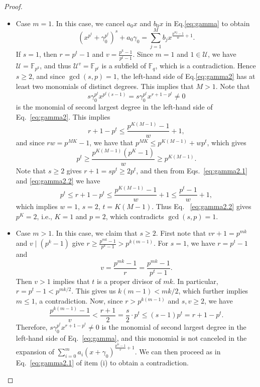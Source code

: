 \documentclass[11pt]{amsart}
\newcommand{\F}{\mathbb{F}}
\theoremstyle{definition}
\theoremstyle{remark}
\begin{document}
\begin{proof}
 
 \begin{itemize}%
\item Case $m=1$. In this case, we cancel $a_0x$ and $b_0x$ in Eq.\eqref{eq:gamma} to obtain
\begin{equation}\label{eq:gamma2}(x^{p^t}+\gamma_0^{p^t})^{s}+a_0\gamma_0=\sum_{j=1}^{M}b_jx^{\frac{p^{Kj}-1}{w}+1}.\end{equation}
If $s=1$, then $r=p^t-1$ and $v=\frac{p^k-1}{p^t-1}$. Since $m=1$ and $1\in \mathcal U$, we have  $\mathcal U=\F_{p^k}$, and thus $\mathcal U^v= \F_{p^t}$ is a subfield of $\F_q$, which is a contradiction. Hence $s\geq 2$, and since $\gcd(s, p)=1$, the left-hand side of Eq.\eqref{eq:gamma2} has at least two monomials of distinct degrees. This implies that $M>1$.
 Note  that $$s\gamma_0^{p^t}x^{p^t(s-1)}=s\gamma_0^{p^t}x^{r+1-p^t} \neq 0$$ is the  monomial of second largest degree in the left-hand side of Eq.~\eqref{eq:gamma2}. This implies 
 \begin{equation}\label{eq:gamma2.1}
 r+1-p^t\le \frac{p^{K(M-1)}-1}{w}+1,
 \end{equation}
 and since $rw=p^{MK}-1$, we have that
 $p^{MK}\le p^{K(M-1)}+wp^t$, which gives 
   \begin{equation}\label{eq:gamma2.2}
 p^{t}\ge \frac{p^{K(M-1)} (p^K-1)}{w}\geq p^{K(M-1)}.
  \end{equation}
Note that  $s\geq 2$  gives  $r+1=sp^t\geq 2p^t$, and then  from  Eqs.~\eqref{eq:gamma2.1}  and  \eqref{eq:gamma2.2} we have 
 $$p^t\leq r+1-p^t\leq  \frac{p^{K(M-1)}-1}{w}+ 1\le \frac{p^{t}-1}{w}+1,$$
which implies  $w=1$, $s=2$, $t=K(M-1)$. Thus Eq. ~\eqref{eq:gamma2.2} gives $p^K=2$, i.e., $K=1$ and $p=2$, which contradicts $\gcd(s, p)=1$.
 
 
 \item Case  $m>1$. In this case, we  claim that $s\geq 2$. First note that  $vr+1=p^{mk}$  and $v \mid (p^k-1)$ give   $r\ge \frac{p^{mk}-1}{p^k-1}>p^{k(m-1)}$.
For $s=1$, we have   $r=p^t-1$  and
  $$v=\frac{p^{mk}-1}{r}=\frac{p^{mk}-1}{p^t-1}.$$
Then $v>1$ implies  that $t$ is a proper divisor of $mk$. In particular, $r=p^t-1< p^{mk/2}$.  This gives us $k(m-1) < mk/2$, which further implies $m \leq 1$, a contradiction.
Now, since $r>p^{k(m-1)}$ and $s, v\ge 2$, we have
 $$\frac{p^{k(m-1)}-1}{v}<\frac{r+1}{2}= \frac{s}{2}\cdot p^t\le (s-1)p^t=r+1-p^t.$$ 
 Therefore, $s\gamma_0^{p^t}x^{r+1-p^t}\neq 0$ is the monomial of second largest degree in the  left-hand side  of Eq.~\eqref{eq:gamma}, and this monomial is not canceled in the expansion of $\sum_{i=0}^{m}a_i(x+\gamma_0)^{\frac{p^{ki}-1}{v}+1}$. We can then proceed as  in  Eq.~\eqref{eq:gamma2.1} of item (i) to obtain a contradiction.

\end{itemize}
 \end{proof}
 
\end{document}
